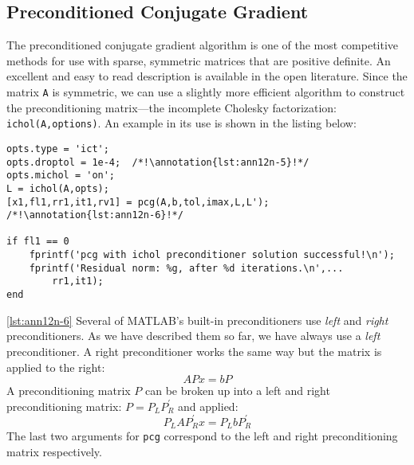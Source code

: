\subsection{Preconditioned Conjugate Gradient}
The preconditioned conjugate gradient algorithm is one of the most competitive methods for use with sparse, symmetric matrices that are positive definite.  An excellent and easy to read description is available in the open literature.\cite{shewchuk1994conjugate}  Since the matrix \lstinline[style=myMatlab]{A} is symmetric, we can use a slightly more efficient algorithm to construct the preconditioning matrix---the incomplete Cholesky factorization: \lstinline[style=myMatlab]{ichol(A,options)}.  An example in its use is shown in the listing below:
\begin{lstlisting}[style=myMatlab]
%% preconditioned conjugate gradient
opts.type = 'ict';
opts.droptol = 1e-4;  /*!\annotation{lst:ann12n-5}!*/
opts.michol = 'on';
L = ichol(A,opts);
[x1,fl1,rr1,it1,rv1] = pcg(A,b,tol,imax,L,L'); /*!\annotation{lst:ann12n-6}!*/

if fl1 == 0
    fprintf('pcg with ichol preconditioner solution successful!\n');
    fprintf('Residual norm: %g, after %d iterations.\n',...
        rr1,it1);
end
\end{lstlisting}

\vspace{0.1cm}

\noindent \ref{lst:ann12n-6} Several of MATLAB's built-in preconditioners use \emph{left} and \emph{right} preconditioners.  As we have described them so far, we have always use a \emph{left} preconditioner.  A right preconditioner works the same way but the matrix is applied to the right:
$$APx = bP  $$
A preconditioning matrix $P$ can be broken up into a left and right preconditioning matrix: $P = P_L P_R^{\prime}$ and applied: $$P_L A P_R^{\prime} x = P_{L}bP_R^{\prime}$$
The last two arguments for \lstinline[style=myMatlab]{pcg} correspond to the left and right preconditioning matrix respectively.   

